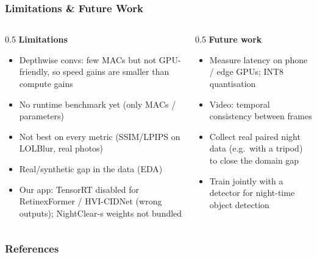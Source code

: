 ﻿\documentclass[
    11pt,%
    aspectratio=169,%
]{beamer}
\begin{document}
\begin{frame}
    \frametitle{Limitations \& Future Work}
    \begin{columns}[t]
        \begin{column}{0.5\textwidth}
            \footnotesize
            \textbf{Limitations}
            \begin{itemize}
                \item Depthwise convs: few MACs but not GPU-friendly, so speed gains are smaller than compute gains
                \item No runtime benchmark yet (only MACs / parameters)
                \item Not best on every metric (SSIM/LPIPS on LOLBlur, real photos)
                \item Real/synthetic gap in the data (EDA)
                \item Our app: TensorRT disabled for RetinexFormer / HVI-CIDNet (wrong outputs); NightClear-s weights not bundled
            \end{itemize}
        \end{column}
        \begin{column}{0.5\textwidth}
            \footnotesize
            \textbf{Future work}
            \begin{itemize}
                \item Measure latency on phone / edge GPUs; INT8 quantisation
                \item Video: temporal consistency between frames
                \item Collect real paired night data (e.g.\ with a tripod) to close the domain gap
                \item Train jointly with a detector for night-time object detection
            \end{itemize}
        \end{column}
    \end{columns}
\end{frame}

\begin{frame}
    \frametitle{References}
    \renewcommand*{\bibfont}{\scriptsize}
    \printbibliography
\end{frame}

\end{document}
